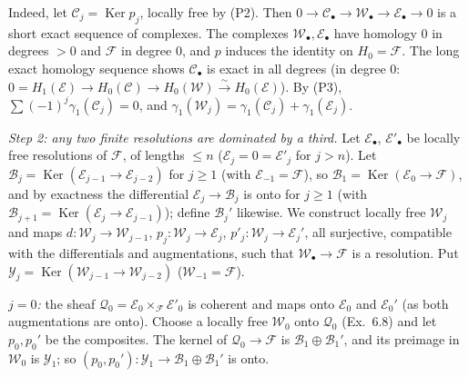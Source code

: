 \documentclass[11pt]{article}
\begin{document}
Indeed, let $\mathcal C_j=\operatorname{Ker}p_j$, locally free by (P2). Then $0\to\mathcal C_\bullet\to\mathcal W_\bullet\to\mathcal E_\bullet\to0$ is a short exact sequence of complexes. The complexes $\mathcal W_\bullet,\mathcal E_\bullet$ have homology $0$ in degrees $>0$ and $\mathcal F$ in degree $0$, and $p$ induces the identity on $H_0=\mathcal F$. The long exact homology sequence shows $\mathcal C_\bullet$ is exact in all degrees (in degree $0$: $0=H_1(\mathcal E)\to H_0(\mathcal C)\to H_0(\mathcal W)\xrightarrow{\sim}H_0(\mathcal E)$). By (P3), $\sum(-1)^j\gamma_1(\mathcal C_j)=0$, and $\gamma_1(\mathcal W_j)=\gamma_1(\mathcal C_j)+\gamma_1(\mathcal E_j)$.

\emph{Step 2: any two finite resolutions are dominated by a third.} Let $\mathcal E_\bullet$, $\mathcal E'_\bullet$ be locally free resolutions of $\mathcal F$, of lengths $\le n$ ($\mathcal E_j=0=\mathcal E'_j$ for $j>n$). Let $\mathcal B_j=\operatorname{Ker}(\mathcal E_{j-1}\to\mathcal E_{j-2})$ for $j\ge1$ (with $\mathcal E_{-1}=\mathcal F$), so $\mathcal B_1=\operatorname{Ker}(\mathcal E_0\to\mathcal F)$, and by exactness the differential $\mathcal E_j\to\mathcal B_j$ is onto for $j\ge1$ (with $\mathcal B_{j+1}=\operatorname{Ker}(\mathcal E_j\to\mathcal E_{j-1})$); define $\mathcal B_j'$ likewise. We construct locally free $\mathcal W_j$ and maps $d\colon\mathcal W_j\to\mathcal W_{j-1}$, $p_j\colon\mathcal W_j\to\mathcal E_j$, $p'_j\colon\mathcal W_j\to\mathcal E_j'$, all surjective, compatible with the differentials and augmentations, such that $\mathcal W_\bullet\to\mathcal F$ is a resolution. Put $\mathcal Y_j=\operatorname{Ker}(\mathcal W_{j-1}\to\mathcal W_{j-2})$ ($\mathcal W_{-1}=\mathcal F$).

\emph{$j=0$:} the sheaf $\mathcal Q_0=\mathcal E_0\times_{\mathcal F}\mathcal E'_0$ is coherent and maps onto $\mathcal E_0$ and $\mathcal E_0'$ (as both augmentations are onto). Choose a locally free $\mathcal W_0$ onto $\mathcal Q_0$ (Ex.~6.8) and let $p_0,p_0'$ be the composites. The kernel of $\mathcal Q_0\to\mathcal F$ is $\mathcal B_1\oplus\mathcal B_1'$, and its preimage in $\mathcal W_0$ is $\mathcal Y_1$; so $(p_0,p_0')\colon\mathcal Y_1\to\mathcal B_1\oplus\mathcal B_1'$ is onto.
\end{document}
